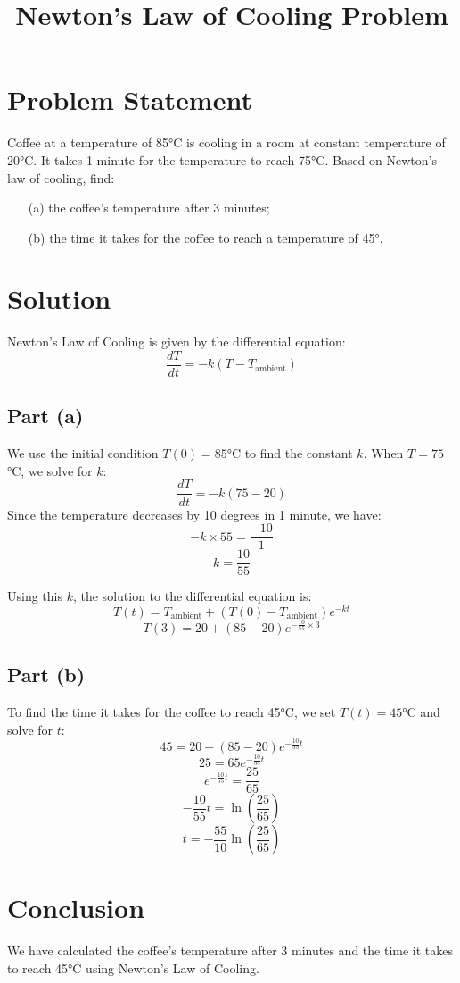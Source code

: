 \documentclass{article}
\begin{document}
\title{Newton's Law of Cooling Problem}
\date{}
\maketitle

\section*{Problem Statement}
Coffee at a temperature of 85°C is cooling in a room at constant temperature of 20°C. It takes 1 minute for the temperature to reach 75°C. Based on Newton's law of cooling, find:
\begin{enumerate}
    \item[(a)] the coffee’s temperature after 3 minutes;
    \item[(b)] the time it takes for the coffee to reach a temperature of 45°.
\end{enumerate}

\section*{Solution}
Newton's Law of Cooling is given by the differential equation:
\[ \frac{dT}{dt} = -k(T - T_{\text{ambient}}) \]

\subsection*{Part (a)}
We use the initial condition \( T(0) = 85 \)°C to find the constant \( k \). When \( T = 75 \)°C, we solve for \( k \):
\[ \frac{dT}{dt} = -k(75 - 20) \]
Since the temperature decreases by 10 degrees in 1 minute, we have:
\[ -k \times 55 = \frac{-10}{1} \]
\[ k = \frac{10}{55} \]

Using this \( k \), the solution to the differential equation is:
\[ T(t) = T_{\text{ambient}} + (T(0) - T_{\text{ambient}})e^{-kt} \]
\[ T(3) = 20 + (85 - 20)e^{-\frac{10}{55} \times 3} \]

\subsection*{Part (b)}
To find the time it takes for the coffee to reach 45°C, we set \( T(t) = 45 \)°C and solve for \( t \):
\[ 45 = 20 + (85 - 20)e^{-\frac{10}{55}t} \]
\[ 25 = 65e^{-\frac{10}{55}t} \]
\[ e^{-\frac{10}{55}t} = \frac{25}{65} \]
\[ -\frac{10}{55}t = \ln\left(\frac{25}{65}\right) \]
\[ t = -\frac{55}{10}\ln\left(\frac{25}{65}\right) \]

\section*{Conclusion}
We have calculated the coffee's temperature after 3 minutes and the time it takes to reach 45°C using Newton's Law of Cooling.
\end{document}
